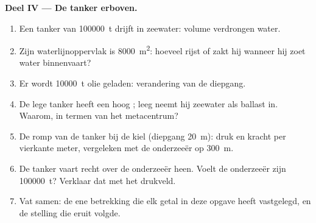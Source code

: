 \begin{problem}
\medskip
\noindent\textbf{Deel IV --- De tanker erboven.}
\begin{enumerate}[resume]
  \item Een tanker van \qty{100000}{t} drijft in zeewater: volume verdrongen
        water.
  \item Zijn waterlijnoppervlak is \qty{8000}{m^2}: hoeveel rijst of zakt hij
        wanneer hij zoet water binnenvaart?
  \item Er wordt \qty{10000}{t} olie geladen: verandering van de diepgang.
  \item De lege tanker heeft een hoog ; leeg neemt hij zeewater
        als ballast in. Waarom, in termen van het metacentrum?
  \item De romp van de tanker bij de kiel (diepgang \qty{20}{m}): druk en
        kracht per vierkante meter, vergeleken met de onderzeeër op
        \qty{300}{m}.
  \item De tanker vaart recht over de onderzeeër heen. Voelt de
        onderzeeër zijn \qty{100000}{t}? Verklaar dat met het drukveld.
  \item Vat samen: de ene betrekking die elk getal in deze opgave heeft
        vastgelegd, en de stelling die eruit volgde.
\end{enumerate}
\end{problem}

